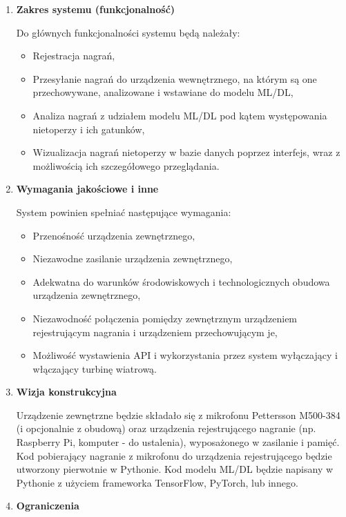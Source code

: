 \documentclass{sprz}
\begin{document}
\begin{enumerate}[label=\textbf{\arabic*}.]
  \item \textbf{Zakres systemu (funkcjonalność)}
  
    Do głównych funkcjonalności systemu będą należały:

    \begin{itemize}
      \item Rejestracja nagrań,
      \item Przesyłanie nagrań do urządzenia wewnętrznego, na którym są one przechowywane, analizowane i wstawiane do modelu ML/DL,
      \item Analiza nagrań z udziałem modelu ML/DL pod kątem występowania nietoperzy i ich gatunków,
      \item Wizualizacja nagrań nietoperzy w bazie danych poprzez interfejs, wraz z możliwością ich szczegółowego przeglądania.
    \end{itemize}

  \item \textbf{Wymagania jakościowe i inne}
  
    System powinien spełniać następujące wymagania:

    \begin{itemize}
        \item Przenośność urządzenia zewnętrznego,
        \item Niezawodne zasilanie urządzenia zewnętrznego,
        \item Adekwatna do warunków środowiskowych i technologicznych obudowa urządzenia zewnętrznego,
        \item Niezawodność połączenia pomiędzy zewnętrznym urządzeniem rejestrującym nagrania i urządzeniem przechowującym je,
        \item Możliwość wystawienia API i wykorzystania przez system wyłączający i włączający turbinę wiatrową.
    \end{itemize}

  \item \textbf{Wizja konstrukcyjna}
  
    Urządzenie zewnętrzne będzie składało się z mikrofonu Pettersson M500-384 (i opcjonalnie z obudową) oraz urządzenia rejestrującego nagranie (np. Raspberry Pi, komputer - do ustalenia), wyposażonego w zasilanie i pamięć. Kod pobierający nagranie z mikrofonu do urządzenia rejestrującego będzie utworzony pierwotnie w Pythonie. Kod modelu ML/DL będzie napisany w Pythonie z użyciem frameworka TensorFlow, PyTorch, lub innego.  

  \item \textbf{Ograniczenia}
  

\end{enumerate}
\end{document}
